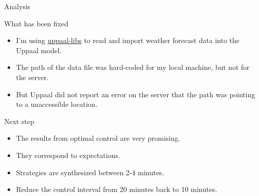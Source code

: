 \documentclass[notheorems,aspectratio=169]{beamer}
\begin{document}
\begin{frame}{Analysis}
	\begin{block}{What has been fixed}
		\begin{itemize}
			\item I'm using \href{https://github.com/UPPAALModelChecker/uppaal-libs}{uppaal-libs} to read and import weather forecast data into the Uppaal model.
			\item The path of the data file was hard-coded for my local machine, but not for the server.
			\item But Uppaal did not report an error on the server that the path was pointing to a unaccessible location.
		\end{itemize}
	\end{block}
	
	\begin{block}{Next step}
		\begin{itemize}
			\item The results from optimal control are very promising. 
			\item They correspond to expectations.
			\item Strategies are synthesized between 2-4 minutes.
			\item Reduce the control interval from 20 minutes back to 10 minutes.
		\end{itemize}
	\end{block}
\end{frame}
\end{document}
